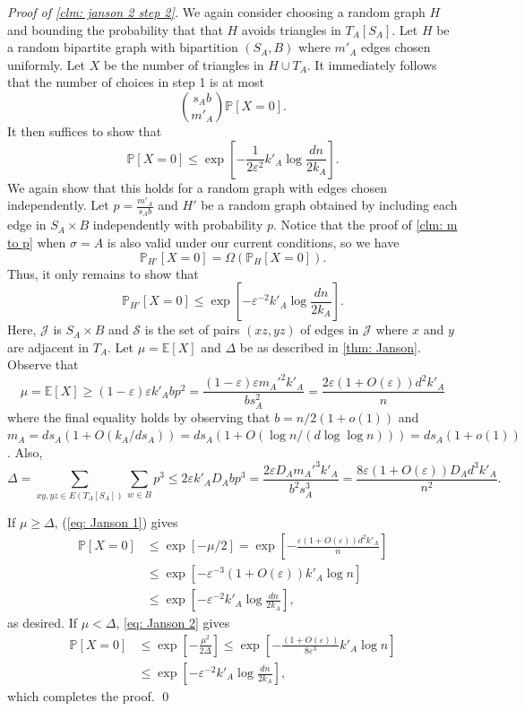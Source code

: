 \documentclass[11pt]{article}
\newcommand{\eps}{\varepsilon}
\def\P{\mathbb P}
\theoremstyle{plain}
\begin{document}
\medskip 
\noindent\textit{Proof of \cref{clm: janson 2 step 2}.}
We again consider choosing a random graph $H$ and bounding the probability that that $H$ avoids triangles in $T_A[S_A]$. Let $H$ be a random bipartite graph with bipartition $(S_A, B)$ where $m'_A$ edges chosen uniformly. Let $X$ be the number of triangles in $H \cup T_A$. It immediately follows that the number of choices in step 1 is at most 
\[
\binom{s_Ab}{m'_A}\P[X = 0].
\]
It then suffices to show that 
\begin{equation}\label{eq: desired prob 2}
    \P[X = 0] \leq \exp\left[-\frac{1}{2\eps^2}k'_A\log\frac{dn}{2k_A}\right].
\end{equation}
We again show that this holds for a random graph with edges chosen independently. Let $p = \frac{m'_A}{s_Ab}$ and $H'$ be a random graph obtained by including each edge in $S_A \times B$ independently with probability $p$. Notice that the proof of \cref{clm: m to p} when $\sigma = A$ is also valid under our current conditions, so we have
    \[
    \P_{H'}[X = 0] = \Omega(\P_{H}[X = 0]).
    \]
Thus, it only remains to show that 
\[
\mathbb P_{H'}[X = 0] \leq \exp\left[ -\eps^{-2}k'_A\log\frac{dn}{2k_A} \right].
\]
 Here, $\mathcal J$ is $S_A \times B$ and $\mathcal S$ is the set of pairs $(xz,yz)$ of edges in $\mathcal J$ where $x$ and $y$ are adjacent in $T_A$. Let $\mu = \mathbb E[X]$ and $\Delta$ be as described in \cref{thm: Janson}. Observe that 
    \begin{equation}\label{eq: Janson 2 mu}
        \mu = \mathbb E[X] \geq (1 - \eps)\eps k'_Abp^2 = \frac{(1 - \eps)\eps m_A'^2k'_A}{bs_A^2} = \frac{2\eps(1 + O(\eps))d^2k'_A}{n}
    \end{equation}
    where the final equality holds by observing that $b = n/2(1 + o(1))$ and $m_A = ds_A(1 + O(k_A/ds_A)) = ds_A(1 + O(\log n/(d\log\log n))) = ds_A(1 + o(1))$.
    Also, 
    \begin{equation}\label{eq: Janson 2 Del}
        \Delta = \sum_{xy, yz \in E(T_A[S_A])}\sum_{w \in B} p^3 \leq 2\eps k'_AD_{A}bp^3 = \frac{2\eps D_{A}m_A'^3k'_A}{b^2s_A^3} = \frac{8\eps (1 + O(\eps))D_Ad^3k'_A}{n^2}.
    \end{equation}

    If $\mu \geq \Delta$, (\ref{eq: Janson 1}) gives 
    \begin{align*}
        \mathbb P[X = 0] &\leq \exp[-\mu/2] = \exp\left[ -\frac{\eps(1 + O(\eps))d^2k'_A}{n} \right] \\
        &\leq \exp\left[ -\eps^{-3}(1 + O(\eps))k'_A\log n \right] \\
        &\leq  \exp\left[ -\eps^{-2}k'_A\log\frac{dn}{2k_A} \right],
    \end{align*}
as desired.
    If $\mu < \Delta$, \cref{eq: Janson 2} gives
    \begin{align*}
        \mathbb P[X = 0] &\leq \exp\left[ -\frac{\mu^2}{2\Delta} \right] \leq \exp\left[ -\frac{(1 + O(\eps))}{8\eps^3}k'_A\log n \right]\\ 
        &\leq \exp\left[ -\eps^{-2}k'_A\log\frac{dn}{2k_A} \right], 
    \end{align*}
    which completes the proof.
    \qed
\end{document}

